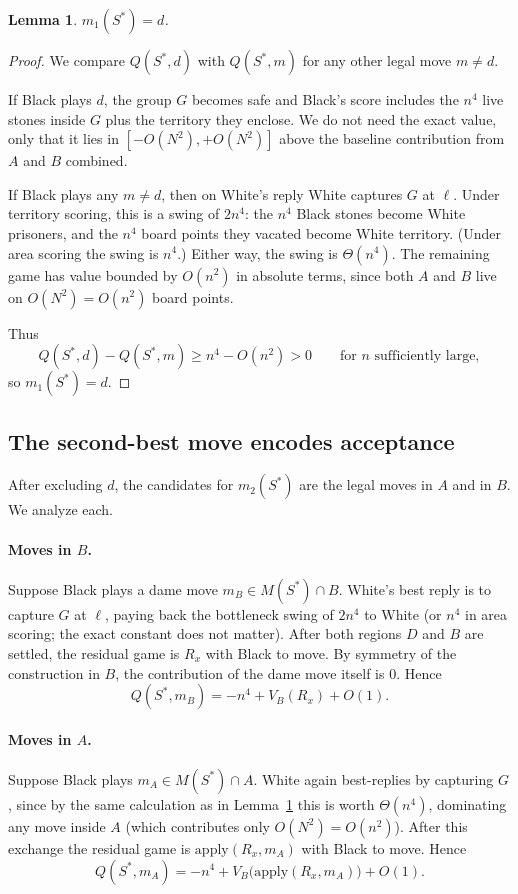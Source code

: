 \documentclass[11pt,a4paper]{amsart}
\theoremstyle{plain}
\newtheorem{lemma}[theorem]{Lemma}
\theoremstyle{definition}
\theoremstyle{remark}
\newcommand{\Apply}{\mathrm{apply}}
\begin{document}
\begin{lemma}
\label{lem:m1}
$m_1(S^*) = d$.
\end{lemma}

\begin{proof}
We compare $Q(S^*, d)$ with $Q(S^*, m)$ for any other legal move
$m \neq d$.

If Black plays $d$, the group $G$ becomes safe and Black's score
includes the $n^4$ live stones inside $G$ plus the territory they
enclose. We do not need the exact value, only that it lies in
$[-O(N^2), +O(N^2)]$ above the baseline contribution from $A$ and $B$
combined.

If Black plays any $m \neq d$, then on White's reply White captures $G$
at $\ell$. Under territory scoring, this is a swing of $2 n^4$:
the $n^4$ Black stones become White prisoners, and the $n^4$ board
points they vacated become White territory. (Under area scoring the
swing is $n^4$.) Either way, the swing is $\Theta(n^4)$.
The remaining game has value bounded by $O(n^2)$ in absolute terms,
since both $A$ and $B$ live on $O(N^2) = O(n^2)$ board points.

Thus
\[
  Q(S^*, d) - Q(S^*, m) \geq n^4 - O(n^2) > 0
  \qquad\text{for } n \text{ sufficiently large},
\]
so $m_1(S^*) = d$.
\end{proof}

\subsection{The second-best move encodes acceptance}

After excluding $d$, the candidates for $m_2(S^*)$ are the legal moves
in $A$ and in $B$. We analyze each.

\paragraph{Moves in $B$.}
Suppose Black plays a dame move $m_B \in M(S^*) \cap B$. White's best
reply is to capture $G$ at $\ell$, paying back the bottleneck swing of
$2 n^4$ to White (or $n^4$ in area scoring; the exact constant does not
matter). After both regions $D$ and $B$ are settled, the residual game
is $R_x$ with Black to move. By symmetry of the construction in $B$,
the contribution of the dame move itself is $0$. Hence
\[
  Q(S^*, m_B) = -n^4 + V_B(R_x) + O(1).
\]

\paragraph{Moves in $A$.}
Suppose Black plays $m_A \in M(S^*) \cap A$. White again best-replies
by capturing $G$, since by the same calculation as in
Lemma~\ref{lem:m1} this is worth $\Theta(n^4)$, dominating any move
inside $A$ (which contributes only $O(N^2) = O(n^2)$). After this
exchange the residual game is $\Apply(R_x, m_A)$ with Black to move.
Hence
\[
  Q(S^*, m_A) = -n^4 + V_B\bigl(\Apply(R_x, m_A)\bigr) + O(1).
\]
\end{document}
